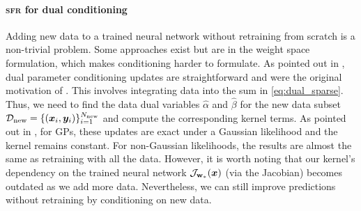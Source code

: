 \documentclass{article} %
\newcommand{\our}{\textsc{sfr}\xspace}
\newcommand{\weights}{\ensuremath{\mathbf{w}}}
\newcommand{\mbf}[1]{\mathbf{#1}}
\newcommand{\MB}{\mbf{B}}
\newcommand{\MZ}{\mbf{Z}}
\newcommand{\T}{\top}
\newcommand{\Jac}[2]{\mathcal{J}_{#1}(#2)}
\begin{document}
\paragraph{\our for dual conditioning} Adding new data to a trained neural network without retraining from scratch is a non-trivial problem. Some approaches exist \citep{kirsch2022marginal, spiegelhalter1990sequential} but are in the weight space formulation, which makes conditioning harder to formulate. As pointed out in \cite{chang2022fantasizing}, dual parameter conditioning updates are straightforward and were the original motivation of \cite{csato2002sparse}. This involves integrating data into the sum in \cref{eq:dual_sparse}. Thus, we need to find the data dual variables $\hat{\alpha}$ and $\hat{\beta}$ for the new data subset $\mathcal{D}_\textrm{new} = \{({\bm{x}}_i,{\bm{y}}_i)\}_{i=1}^{N_{\textrm{new}}}$ and compute the corresponding kernel terms. As pointed out in \cite{chang2022fantasizing}, for GPs, these updates are exact under a Gaussian likelihood and the kernel remains constant. For non-Gaussian likelihoods, the results are almost the same as retraining with all the data. However, it is worth noting that our kernel's dependency on the trained neural network $\Jac{\weights_*}{\vx}$ (via the Jacobian) becomes outdated as we add more data. Nevertheless, we can still improve predictions without retraining by conditioning on new data.
\end{document}
